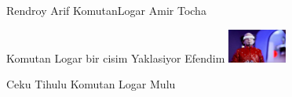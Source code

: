 \documentclass{exam}
\begin{document}
\begin{questions}
\begin{oneparchoices}
\choice Rendroy
\choice Arif
\choice KomutanLogar
\choice Amir Tocha
\end{oneparchoices}
\question Komutan Logar bir cisim Yaklasiyor Efendim\newline
\includegraphics[height=3em]{tihulu.jpeg} \newline
\begin{oneparchoices}
\choice Ceku
\choice Tihulu
\choice Komutan Logar
\choice Mulu
\end{oneparchoices}
\end{questions}
\end{document}

